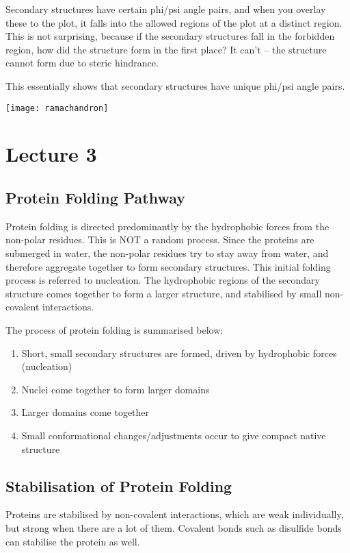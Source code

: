 \documentclass[a4paper, 12pt]{report}
\newcommand{\mychapter}[2]{
    \setcounter{chapter}{#1}
    \setcounter{section}{0}
    \chapter*{#2}
    \addcontentsline{toc}{chapter}{#2}
}
\begin{document}
Secondary structures have certain phi/psi angle pairs, and when you overlay these to the plot, it falls into the allowed regions of the plot at a distinct region.
This is not surprising, because if the secondary structures fall in the forbidden region, how did the structure form in the first place?
It can't -- the structure cannot form due to steric hindrance.

This essentially shows that secondary structures have unique phi/psi angle pairs.

\texttt{[image: ramachandron]}

\mychapter{3}{Lecture 3}

\section{Protein Folding Pathway}

Protein folding is directed predominantly by the hydrophobic forces from the non-polar residues.
This is NOT a random process.
Since the proteins are submerged in water, the non-polar residues try to stay away from water, and therefore aggregate together to form secondary structures.
This initial folding process is referred to nucleation.
The hydrophobic regions of the secondary structure comes together to form a larger structure, and stabilised by small non-covalent interactions.

The process of protein folding is summarised below:
\begin{enumerate}
\item Short, small secondary structures are formed, driven by hydrophobic forces (nucleation)
\item Nuclei come together to form larger domains
\item Larger domains come together
\item Small conformational changes/adjustments occur to give compact native structure
\end{enumerate}

\section{Stabilisation of Protein Folding}

Proteins are stabilised by non-covalent interactions, which are weak individually, but strong when there are a lot of them.
Covalent bonds such as disulfide bonds can stabilise the protein as well.

\end{document}
